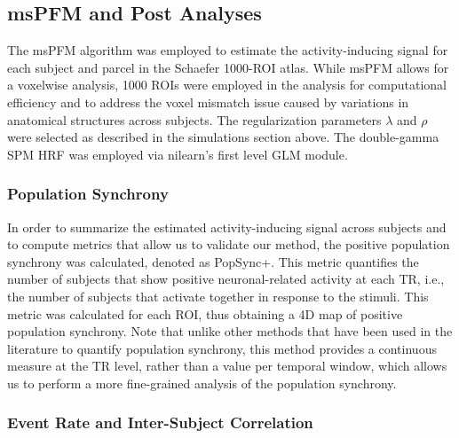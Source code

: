 \subsection{msPFM and Post Analyses}

The msPFM algorithm was employed to estimate the activity-inducing signal for
each subject and parcel in the Schaefer 1000-ROI atlas. While msPFM allows for a
voxelwise analysis, 1000 ROIs were employed in the analysis for computational
efficiency and to address the voxel mismatch issue caused by variations in
anatomical structures across subjects. The regularization parameters $\lambda$
and $\rho$ were selected as described in the simulations section above. The
double-gamma SPM HRF was employed via nilearn's first level GLM module.

\subsubsection*{Population Synchrony}

In order to summarize the estimated activity-inducing signal across subjects and
to compute metrics that allow us to validate our method, the positive population
synchrony was calculated, denoted as PopSync+. This metric quantifies the number
of subjects that show positive neuronal-related activity at each TR, i.e., the
number of subjects that activate together in response to the stimuli. This
metric was calculated for each ROI, thus obtaining a 4D map of positive
population synchrony. Note that unlike other methods that have been used in the
literature to quantify population synchrony, this method provides a continuous
measure at the TR level, rather than a value per temporal window, which allows
us to perform a more fine-grained analysis of the population synchrony.

\subsubsection*{Event Rate and Inter-Subject Correlation}

